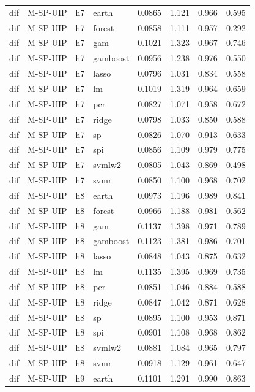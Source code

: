 \begin{ThreePartTable}
\begin{longtable}[t]{llclcccc}
\addlinespace
dif & M-SP-UIP & h7 & earth & 0.0865 & 1.121 & 0.966 & 0.595\\
dif & M-SP-UIP & h7 & forest & 0.0858 & 1.111 & 0.957 & 0.292\\
dif & M-SP-UIP & h7 & gam & 0.1021 & 1.323 & 0.967 & 0.746\\
dif & M-SP-UIP & h7 & gamboost & 0.0956 & 1.238 & 0.976 & 0.550\\
dif & M-SP-UIP & h7 & lasso & 0.0796 & 1.031 & 0.834 & 0.558\\
dif & M-SP-UIP & h7 & lm & 0.1019 & 1.319 & 0.964 & 0.659\\
dif & M-SP-UIP & h7 & pcr & 0.0827 & 1.071 & 0.958 & 0.672\\
dif & M-SP-UIP & h7 & ridge & 0.0798 & 1.033 & 0.850 & 0.588\\
dif & M-SP-UIP & h7 & sp & 0.0826 & 1.070 & 0.913 & 0.633\\
dif & M-SP-UIP & h7 & spi & 0.0856 & 1.109 & 0.979 & 0.775\\
dif & M-SP-UIP & h7 & svmlw2 & 0.0805 & 1.043 & 0.869 & 0.498\\
dif & M-SP-UIP & h7 & svmr & 0.0850 & 1.100 & 0.968 & 0.702\\
\addlinespace
dif & M-SP-UIP & h8 & earth & 0.0973 & 1.196 & 0.989 & 0.841\\
dif & M-SP-UIP & h8 & forest & 0.0966 & 1.188 & 0.981 & 0.562\\
dif & M-SP-UIP & h8 & gam & 0.1137 & 1.398 & 0.971 & 0.789\\
dif & M-SP-UIP & h8 & gamboost & 0.1123 & 1.381 & 0.986 & 0.701\\
dif & M-SP-UIP & h8 & lasso & 0.0848 & 1.043 & 0.875 & 0.632\\
dif & M-SP-UIP & h8 & lm & 0.1135 & 1.395 & 0.969 & 0.735\\
dif & M-SP-UIP & h8 & pcr & 0.0851 & 1.046 & 0.884 & 0.588\\
dif & M-SP-UIP & h8 & ridge & 0.0847 & 1.042 & 0.871 & 0.628\\
dif & M-SP-UIP & h8 & sp & 0.0895 & 1.100 & 0.953 & 0.871\\
dif & M-SP-UIP & h8 & spi & 0.0901 & 1.108 & 0.968 & 0.862\\
dif & M-SP-UIP & h8 & svmlw2 & 0.0881 & 1.084 & 0.965 & 0.797\\
dif & M-SP-UIP & h8 & svmr & 0.0918 & 1.129 & 0.961 & 0.647\\
\addlinespace
dif & M-SP-UIP & h9 & earth & 0.1101 & 1.291 & 0.990 & 0.863\\

\end{longtable}
\end{ThreePartTable}
